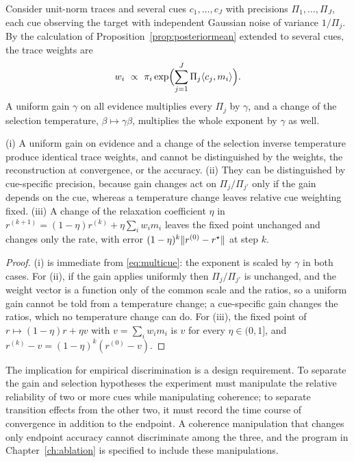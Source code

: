 Consider unit-norm traces and several cues $c_1,\dots,c_J$ with precisions $\Pi_1,\dots,\Pi_J$, each cue observing the target with independent Gaussian noise of variance $1/\Pi_j$. By the calculation of Proposition~\ref{prop:posteriormean} extended to several cues, the trace weights are
\begin{equation}\label{eq:multicue}
w_i\ \propto\ \pi_i\exp\Bigl(\sum_{j=1}^J\Pi_j\ip{c_j}{m_i}\Bigr).
\end{equation}
A uniform gain $\gamma$ on all evidence multiplies every $\Pi_j$ by $\gamma$, and a change of the selection temperature, $\beta\mapsto\gamma\beta$, multiplies the whole exponent by $\gamma$ as well.

\begin{proposition}\label{prop:loci}
(i) A uniform gain on evidence and a change of the selection inverse temperature produce identical trace weights, and cannot be distinguished by the weights, the reconstruction at convergence, or the accuracy. (ii) They can be distinguished by cue-specific precision, because gain changes act on $\Pi_j/\Pi_{j'}$ only if the gain depends on the cue, whereas a temperature change leaves relative cue weighting fixed. (iii) A change of the relaxation coefficient $\eta$ in $r^{(k+1)}=(1-\eta)r^{(k)}+\eta\sum_iw_im_i$ leaves the fixed point unchanged and changes only the rate, with error $(1-\eta)^k\lVert r^{(0)}-r^\star\rVert$ at step $k$.
\end{proposition}

\begin{proof}
(i) is immediate from \eqref{eq:multicue}: the exponent is scaled by $\gamma$ in both cases. For (ii), if the gain applies uniformly then $\Pi_j/\Pi_{j'}$ is unchanged, and the weight vector is a function only of the common scale and the ratios, so a uniform gain cannot be told from a temperature change; a cue-specific gain changes the ratios, which no temperature change can do. For (iii), the fixed point of $r\mapsto(1-\eta)r+\eta v$ with $v=\sum_iw_im_i$ is $v$ for every $\eta\in(0,1]$, and $r^{(k)}-v=(1-\eta)^k(r^{(0)}-v)$.
\end{proof}

The implication for empirical discrimination is a design requirement. To separate the gain and selection hypotheses the experiment must manipulate the relative reliability of two or more cues while manipulating coherence; to separate transition effects from the other two, it must record the time course of convergence in addition to the endpoint. A coherence manipulation that changes only endpoint accuracy cannot discriminate among the three, and the program in Chapter~\ref{ch:ablation} is specified to include these manipulations.

